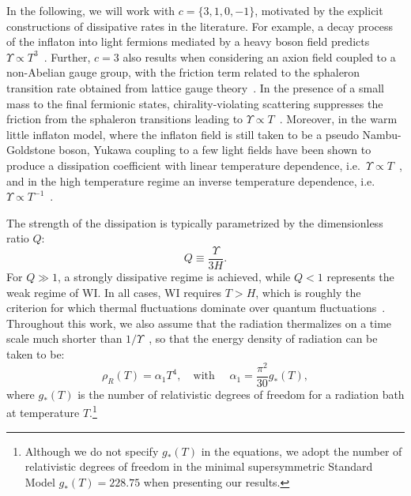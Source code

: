 In the following, we will work with $c=\{3,1,0,-1\}$, motivated by the explicit constructions of dissipative rates in the literature. For example, a decay process of the inflaton into light fermions mediated by a heavy boson field predicts $\Upsilon \propto T^3$~\cite{Moss:2006gt}. Further, $c=3$ also results  when considering an axion field coupled to a non-Abelian gauge group, with the friction term related to the sphaleron transition rate obtained from lattice gauge theory~\cite{Moore:2010jd, Laine:2016hma}. In the presence of a small mass to the final fermionic states, chirality-violating scattering suppresses the friction from the sphaleron transitions leading to $\Upsilon \propto T$~\cite{Berghaus:2020ekh}. Moreover, in the warm little inflaton model, where the inflaton field is still taken to be a pseudo Nambu-Goldstone boson, Yukawa coupling to a few light fields have been shown to produce a dissipation coefficient
with linear temperature dependence, i.e.\ $\Upsilon\propto T$~\cite{Bastero-Gil:2016qru}, and in the high temperature regime an inverse
temperature dependence, i.e.\ $\Upsilon \propto T^{-1}$~\cite{Bastero-Gil:2019gao}. 

The strength of the dissipation is typically parametrized by the dimensionless ratio $Q$:
\begin{equation}
    Q\equiv \frac{\Upsilon}{3H}.
\end{equation}
For $Q\gg1$, a strongly dissipative regime is achieved, while $Q < 1$ represents the weak regime of WI. In all cases, WI requires $T>H$, which is roughly the criterion for which thermal fluctuations dominate over quantum fluctuations~\cite{Berera:1995ie}. Throughout this work, we also assume that the radiation thermalizes on a time scale much shorter than $1/\Upsilon$~\cite{Berera:1995wh,Berera:1995ie}, so that the energy density of radiation can be taken to be:
\begin{equation}
    \rho_R(T)=\alpha_1 T^4, \quad \text{with } \quad \alpha_1=\frac{\pi^2}{30}g_{*}(T), \label{eq:ch4-WI.3}
\end{equation}
where $g_{*}(T)$ is the number of relativistic degrees of freedom for a radiation bath at temperature $T$.\footnote{Although we do not specify $g_{*}(T)$ in the equations, we adopt the number of relativistic degrees of freedom in the minimal supersymmetric Standard Model $g_{*}(T) = 228.75$ when presenting our results.}

